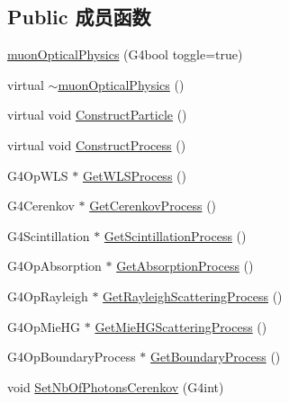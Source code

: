 \subsection*{Public 成员函数}
\begin{DoxyCompactItemize}
\item 
\hyperlink{classmuonOpticalPhysics_a52eeca699e5ceef8bbf6b7e6aa2911d8}{muon\+Optical\+Physics} (G4bool toggle=true)
\item 
virtual \hyperlink{classmuonOpticalPhysics_a1c6b331862dbd2be5421d56b722b405a}{$\sim$muon\+Optical\+Physics} ()
\item 
virtual void \hyperlink{classmuonOpticalPhysics_a0d4026c22223e1cbe9c4db0e4d45699d}{Construct\+Particle} ()
\item 
virtual void \hyperlink{classmuonOpticalPhysics_aee337a42afb4af85865cde2e460e120f}{Construct\+Process} ()
\item 
G4\+Op\+W\+LS $\ast$ \hyperlink{classmuonOpticalPhysics_a257a178b6e1a98c10d9001fe43d0b1c8}{Get\+W\+L\+S\+Process} ()
\item 
G4\+Cerenkov $\ast$ \hyperlink{classmuonOpticalPhysics_a6588a993cc57cade05bb1371c60bf914}{Get\+Cerenkov\+Process} ()
\item 
G4\+Scintillation $\ast$ \hyperlink{classmuonOpticalPhysics_acda9b8ac8d073939523c861833c343ce}{Get\+Scintillation\+Process} ()
\item 
G4\+Op\+Absorption $\ast$ \hyperlink{classmuonOpticalPhysics_a0e66d292a9509fdc6703fcdea0e38c7d}{Get\+Absorption\+Process} ()
\item 
G4\+Op\+Rayleigh $\ast$ \hyperlink{classmuonOpticalPhysics_a443ff15987bae9b5d07155252f7fad9b}{Get\+Rayleigh\+Scattering\+Process} ()
\item 
G4\+Op\+Mie\+HG $\ast$ \hyperlink{classmuonOpticalPhysics_a57eae82cad6cd757dd6e283598a4bf54}{Get\+Mie\+H\+G\+Scattering\+Process} ()
\item 
G4\+Op\+Boundary\+Process $\ast$ \hyperlink{classmuonOpticalPhysics_ad1abfb3c7d0cea07d456c5651390b168}{Get\+Boundary\+Process} ()
\item 
void \hyperlink{classmuonOpticalPhysics_a99125ac76dc52e14be98e0a1326d3f71}{Set\+Nb\+Of\+Photons\+Cerenkov} (G4int)
\end{DoxyCompactItemize}

